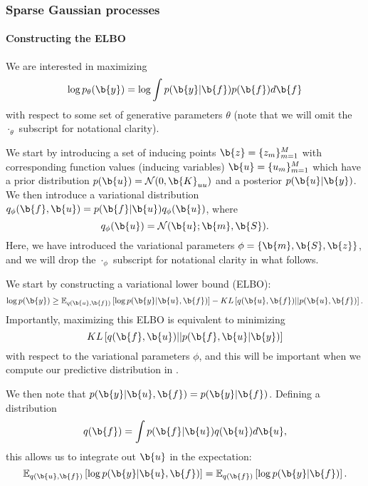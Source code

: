 \subsubsection{Sparse Gaussian processes}


\paragraph*{Constructing the ELBO}

We are interested in maximizing
\begin{equation}
    \log p_\theta (\b{y}) = \log \int p(\b{y}|\b{f}) p(\b{f}) d\b{f}
\end{equation}
with respect to some set of generative parameters $\theta$ (note that we will omit the $\cdot_\theta$ subscript for notational clarity).

We start by introducing a set of inducing points $\b{z} = \{ z_m \}_{m=1}^M$ with corresponding function values (inducing variables) $\b{u} = \{ u_m \}_{m = 1}^M$ which have a prior distribution $p(\b{u}) = \mathcal{N}(0, \b{K}_{uu})$ and a posterior $p(\b{u}|\b{y})$.
We then introduce a variational distribution $q_\phi(\b{f}, \b{u}) = p(\b{f}|\b{u}) q_\phi(\b{u})$, where
\begin{equation}
    q_\phi (\b{u}) = \mathcal{N}(\b{u}; \b{m}, \b{S}).
\end{equation}
Here, we have introduced the variational parameters $\phi = \{ \b{m}, \b{S}, \b{z}\}$, and we will drop the $\cdot_\phi$ subscript for notational clarity in what follows.

We start by constructing a variational lower bound (ELBO):
\begin{equation}
    \log p(\b{y}) \geq \mathbb{E}_{q(\b{u}, \b{f})} \left [ \log p(\b{y} | \b{u}, \b{f}) \right ] - KL \left [ q(\b{u}, \b{f}) || p(\b{u}, \b{f}) \right ].
\end{equation}
Importantly, maximizing this ELBO is equivalent to minimizing
\begin{equation}
    KL \left [ q(\b{f}, \b{u}) || p(\b{f}, \b{u} | \b{y}) \right ]
\end{equation}
with respect to the variational parameters $\phi$, and this will be important when we compute our predictive distribution in .

We then note that $p(\b{y} | \b{u}, \b{f}) = p(\b{y} | \b{f})$.
Defining a distribution
\begin{equation}
    q(\b{f}) = \int p(\b{f} | \b{u}) q(\b{u}) d \b{u},
\end{equation}
this allows us to integrate out $\b{u}$ in the expectation:
\begin{equation}
    \label{eq:lik}
    \mathbb{E}_{q(\b{u}, \b{f})} \left [ \log p(\b{y} | \b{u}, \b{f}) \right ] =
    \mathbb{E}_{q(\b{f})} \left [ \log p(\b{y} |\b{f}) \right ].
\end{equation}

